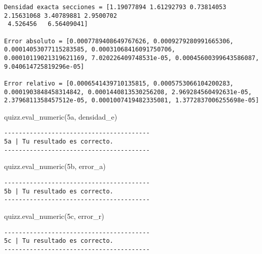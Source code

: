 \documentclass[
  letterpaper,
  DIV=11,
  numbers=noendperiod]{scrreprt}
\newenvironment{Shaded}{\begin{snugshade}}{\end{snugshade}}
\newcommand{\NormalTok}[1]{\textcolor[rgb]{0.00,0.23,0.31}{#1}}
\newcommand{\StringTok}[1]{\textcolor[rgb]{0.13,0.47,0.30}{#1}}
\begin{document}
\begin{verbatim}
Densidad exacta secciones = [1.19077894 1.61292793 0.73814053 2.15631068 3.40789881 2.9500702
 4.526456   6.56409041]

Error absoluto = [0.0007789408649767626, 0.0009279280991665306, 0.00014053077115283585, 0.00031068416091750706, 0.00010119021319621169, 7.020226409748531e-05, 0.00045600399643586087, 9.040614725819296e-05]

Error relativo = [0.0006541439710135815, 0.0005753066104200283, 0.0001903848458314842, 0.0001440813530256208, 2.969284560492631e-05, 2.3796811358457512e-05, 0.0001007419482335081, 1.3772837006255698e-05]
\end{verbatim}

\begin{Shaded}
\begin{Highlighting}[]
\NormalTok{quizz.eval\_numeric(}\StringTok{\textquotesingle{}5a\textquotesingle{}}\NormalTok{, densidad\_e)}
\end{Highlighting}
\end{Shaded}

\begin{verbatim}
----------------------------------------
5a | Tu resultado es correcto.
----------------------------------------
\end{verbatim}

\begin{Shaded}
\begin{Highlighting}[]
\NormalTok{quizz.eval\_numeric(}\StringTok{\textquotesingle{}5b\textquotesingle{}}\NormalTok{, error\_a)}
\end{Highlighting}
\end{Shaded}

\begin{verbatim}
----------------------------------------
5b | Tu resultado es correcto.
----------------------------------------
\end{verbatim}

\begin{Shaded}
\begin{Highlighting}[]
\NormalTok{quizz.eval\_numeric(}\StringTok{\textquotesingle{}5c\textquotesingle{}}\NormalTok{, error\_r)}
\end{Highlighting}
\end{Shaded}

\begin{verbatim}
----------------------------------------
5c | Tu resultado es correcto.
----------------------------------------
\end{verbatim}
\end{document}
